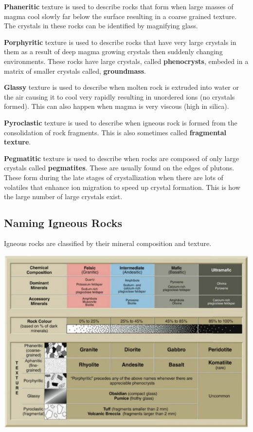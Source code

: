 \documentclass{article}
\begin{document}
\textbf{Phaneritic} texture is used to describe rocks that form when large masses of magma cool slowly far below the surface resulting in a coarse grained texture. The crystals in these rocks can be identified by magnifying glass.

\textbf{Porphyritic} texture is used to describe rocks that have very large crystals in them as a result of deep magma growing crystals then suddenly changing environments. These rocks have large crystals, called \textbf{phenocrysts}, embeded in a matrix of smaller crystals called, \textbf{groundmass}.

\textbf{Glassy} texture is used to describe when molten rock is extruded into water or the air causing it to cool very rapidly resulting in unordered ions (no crystals formed). This can also happen when magma is very viscous (high in silica).

\textbf{Pyroclastic} texture is used to describe when igneous rock is formed from the consolidation of rock fragments. This is also sometimes called \textbf{fragmental texture}.

\textbf{Pegmatitic} texture is used to describe when rocks are composed of only large crystals called \textbf{pegmatites}. These are usually found on the edges of plutons. These form during the late stages of crystallization when there are lots of volatiles that enhance ion migration to speed up crystal formation. This is how the large number of large crystals exist.


\subsection{Naming Igneous Rocks} %
\label{sub:naming_igneous_rocks}
Igneous rocks are classified by their mineral composition and texture.

\includegraphics[width=7in]{igneous-classes}
\end{document}
